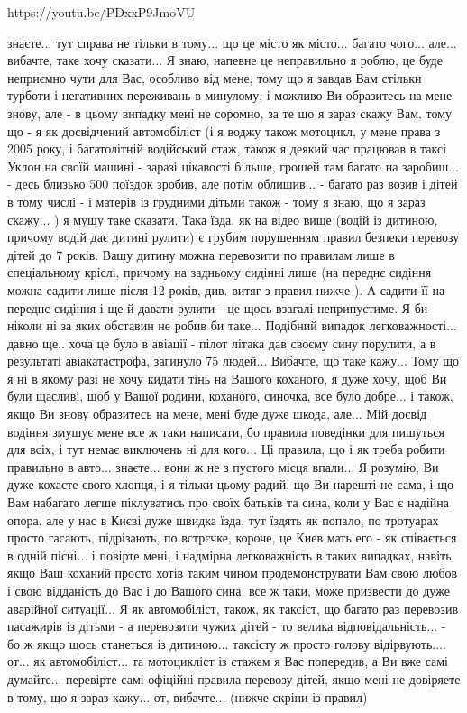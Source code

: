 https://youtu.be/PDxxP9JmoVU


знаєте... тут справа не тільки в тому... що це місто як місто... багато чого...
але... вибачте, таке хочу сказати... Я знаю, напевне це неправильно я роблю, це
буде неприємно чути для Вас, особливо від мене, тому що я завдав Вам стільки
турботи і негативних переживань в минулому, і можливо Ви образитесь на мене
знову, але - в цьому випадку мені не соромно, за те що я зараз скажу Вам, тому
що - я як досвідчений автомобіліст (і я воджу також мотоцикл, у мене права з
2005 року, і багатолітній водійський стаж, також я деякий час працював в таксі
Уклон на своїй машині - заразі цікавості більше, грошей там багато на
заробиш... - десь близько 500 поїздок зробив, але потім облишив... - багато раз
возив і дітей в тому числі - і матерів із грудними дітьми також  - тому я знаю,
що я зараз скажу... ) я мушу таке сказати. Така їзда, як на відео вище (водій
із дитиною, причому водій дає дитині рулити) є грубим порушенням правил безпеки
перевозу дітей до 7 років. Вашу дитину можна перевозити по правилам лише в
спеціальному кріслі, причому на задньому сидінні лише (на переднє сидіння можна
садити лише після 12 років, див. витяг з правил нижче ). А садити її на переднє
сидіння і ще й давати рулити - це щось взагалі неприпустиме. Я би ніколи ні за
яких обставин не робив би таке... Подібний випадок легковажності... давно ще..
хоча це було в авіації - пілот літака дав своєму сину порулити, а в результаті
авіакатастрофа, загинуло 75 людей... Вибачте, що таке кажу... Тому що я ні в
якому разі не хочу кидати тінь на Вашого коханого, я дуже хочу, щоб Ви були
щасливі, щоб у Вашої родини, коханого, синочка, все було добре... і також, якщо
Ви знову образитесь на мене, мені буде дуже шкода, але... Мій досвід водіння
змушує мене все ж таки написати, бо правила поведінки для пишуться для всіх, і
тут немає виключень ні для кого... Ці правила, що і як треба робити правильно в
авто... знаєте... вони ж не з пустого місця впали... Я розумію, Ви дуже кохаєте
свого хлопця, і я тільки цьому радий, що Ви нарешті не сама, і що Вам набагато
легше піклуватись про своїх батьків та сина, коли у Вас є надійна опора, але у
нас в Києві дуже швидка їзда, тут їздять як попало, по тротуарах просто
гасають, підрізають, по встрєчке, короче, це Киев мать его - як співається в
одній пісні... і повірте мені, і надмірна легковажність в таких випадках,
навіть якщо Ваш коханий просто хотів таким чином продемонструвати Вам свою
любов і свою відданість до Вас і до Вашого сина, все ж таки, може призвести до
дуже аварійної ситуації... Я як автомобіліст, також, як таксіст, що багато раз
перевозив пасажирів із дітьми - а перевозити чужих дітей - то велика
відповідальність... - бо ж якщо щось станеться із дитиною... таксісту ж просто
голову відірвують.... от... як автомобіліст... та мотоцикліст із стажем я Вас
попередив, а Ви вже самі думайте... перевірте самі офіційні правила перевозу
дітей, якщо мені не довіряете в тому, що я зараз кажу... от, вибачте... (нижче
скріни із правил)

